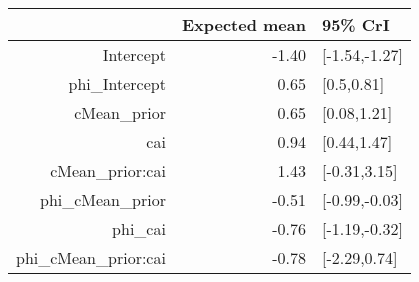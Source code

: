 \begin{tabular}{rrl}
  \hline
 & Expected mean & 95\% CrI \\ 
  \hline
Intercept & -1.40 & [-1.54,-1.27] \\ 
  phi\_Intercept & 0.65 & [0.5,0.81] \\ 
  cMean\_prior & 0.65 & [0.08,1.21] \\ 
  cai & 0.94 & [0.44,1.47] \\ 
  cMean\_prior:cai & 1.43 & [-0.31,3.15] \\ 
  phi\_cMean\_prior & -0.51 & [-0.99,-0.03] \\ 
  phi\_cai & -0.76 & [-1.19,-0.32] \\ 
  phi\_cMean\_prior:cai & -0.78 & [-2.29,0.74] \\ 
   \hline
\end{tabular}

